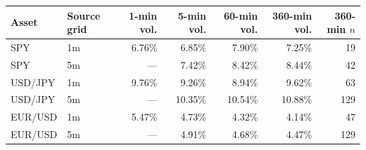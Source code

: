 \begin{tabular}{llrrrrr}
\toprule
Asset & Source grid & 1-min vol. & 5-min vol. & 60-min vol. & 360-min vol. & 360-min $n$ \\
\midrule
SPY & 1m & 6.76\% & 6.85\% & 7.90\% & 7.25\% & 19 \\
SPY & 5m & --- & 7.42\% & 8.42\% & 8.44\% & 42 \\
USD/JPY & 1m & 9.76\% & 9.26\% & 8.94\% & 9.62\% & 63 \\
USD/JPY & 5m & --- & 10.35\% & 10.54\% & 10.88\% & 129 \\
EUR/USD & 1m & 5.47\% & 4.73\% & 4.32\% & 4.14\% & 47 \\
EUR/USD & 5m & --- & 4.91\% & 4.68\% & 4.47\% & 129 \\
\bottomrule
\end{tabular}
